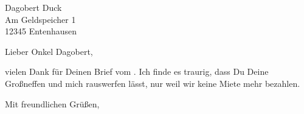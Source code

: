\documentclass[ngerman,12pt]{scrlttr2}
\date{Köln, den \today}
\begin{document}
\begin{letter}{Dagobert Duck \\ Am Geldspeicher 1 \\ 12345 Entenhausen}

\opening{Lieber Onkel Dagobert,}

vielen Dank für Deinen Brief vom . Ich finde es traurig, dass Du Deine Großneffen und mich rauswerfen lässt, nur weil wir keine Miete mehr bezahlen.

\closing{Mit freundlichen Grüßen,}

\end{letter}
\end{document}
